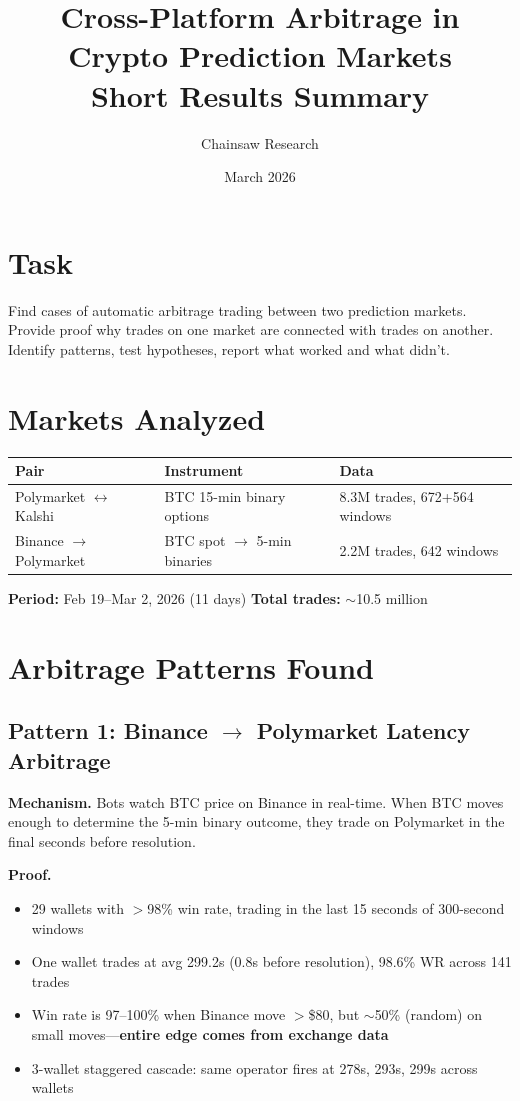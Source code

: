 \documentclass[11pt,a4paper]{article}
\title{\textbf{Cross-Platform Arbitrage in Crypto Prediction Markets}\\[0.3em]
\large Short Results Summary}
\author{Chainsaw Research}
\date{March 2026}
\begin{document}
\maketitle
\thispagestyle{empty}

\section*{Task}
Find cases of automatic arbitrage trading between two prediction markets. Provide proof why trades on one market are connected with trades on another. Identify patterns, test hypotheses, report what worked and what didn't.

\section*{Markets Analyzed}

\begin{tabular}{@{}lll@{}}
\toprule
\textbf{Pair} & \textbf{Instrument} & \textbf{Data} \\
\midrule
Polymarket $\leftrightarrow$ Kalshi & BTC 15-min binary options & 8.3M trades, 672+564 windows \\
Binance $\to$ Polymarket & BTC spot $\to$ 5-min binaries & 2.2M trades, 642 windows \\
\bottomrule
\end{tabular}

\medskip
\noindent\textbf{Period:} Feb 19--Mar 2, 2026 (11 days) \quad \textbf{Total trades:} $\sim$10.5 million

\section*{Arbitrage Patterns Found}

\subsection*{Pattern 1: Binance $\to$ Polymarket Latency Arbitrage}

\textbf{Mechanism.} Bots watch BTC price on Binance in real-time. When BTC moves enough to determine the 5-min binary outcome, they trade on Polymarket in the final seconds before resolution.

\textbf{Proof.}
\begin{itemize}[nosep]
    \item 29 wallets with $>$98\% win rate, trading in the last 15 seconds of 300-second windows
    \item One wallet trades at avg 299.2s (0.8s before resolution), 98.6\% WR across 141 trades
    \item Win rate is 97--100\% when Binance move $>$\$80, but $\sim$50\% (random) on small moves---\textbf{entire edge comes from exchange data}
    \item 3-wallet staggered cascade: same operator fires at 278s, 293s, 299s across wallets
\end{itemize}
\end{document}
